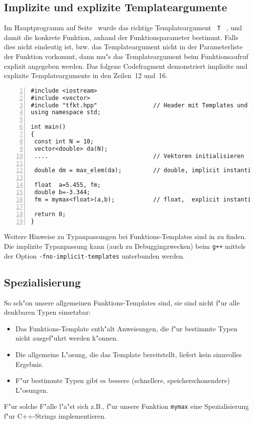 \subsection{Implizite und explizite Templateargumente}
\label{p:10.1.2}
%
Im Hauptprogramm auf Seite~\pageref{code:A7main.cpp} wurde das richtige
Templateargument \verb| T | , und damit die konkrete Funktion,
anhand der Funktionsparameter bestimmt.
Falls dies nicht eindeutig ist, bzw. das Templateargument nicht in der
Parameterliste der Funktion vorkommt, dann mu"s das Templateargument
beim Funktionsaufruf explizit angegeben werden. Das folgene Codefragment
demonstriert implizite und explizite Templateargumente in den Zeilen~12 und~16.

\begin{lstlisting}[caption={Templatefunktion anwenden.},label=lst:fkt_template_main_2,
basicstyle=\scriptsize,numbers=left, numberstyle=\tiny, stepnumber=2, numbersep=5pt]
#include <iostream>
#include <vector>
#include "tfkt.hpp"                // Header mit Templates und deren Sources
using namespace std;

int main()
{
 const int N = 10;
 vector<double> da(N);
 ....                              // Vektoren initialisieren

 double dm = max_elem(da);         // double, implicit instantiation

 float  a=5.455, fm;
 double b=-3.344;
 fm = mymax<float>(a,b);           // float,  explicit instantiation

 return 0;
}
\end{lstlisting}


Weitere Hinweise zu Typanpassungen bei Funktions-Templates sind in
\cite[p.371, p.377]{KirchPrinz:2002:OOP} zu finden.
Die implizite Typanpassung kann (auch zu Debuggingzwecken) beim \verb|g++| mittels der Option
\verb|-fno-implicit-templates| unterbunden werden.
%
%
\subsection{Spezialisierung}
\label{p:10.1.3}
%
So sch"on unsere allgemeinen Funktions-Templates sind, sie sind
nicht f"ur alle denkbaren Typen einsetzbar:
\begin{itemize}
 \item Das Funktions-Template enth"alt Anweisungen, die f"ur bestimmte Typen
 	nicht ausgef"uhrt werden k"onnen.
 \item Die allgemeine L"osung, die das Template bereitstellt, liefert kein
 	sinnvolles Ergebnis.
 \item F"ur bestimmte Typen gibt es bessere (schnellere, speicherschonendere) L"osungen.
\end{itemize}
F"ur solche F"alle l"a"st sich z.B., f"ur unsere Funktion \verb|mymax| eine
Spezialisierung f"ur C++-Strings implementieren.


